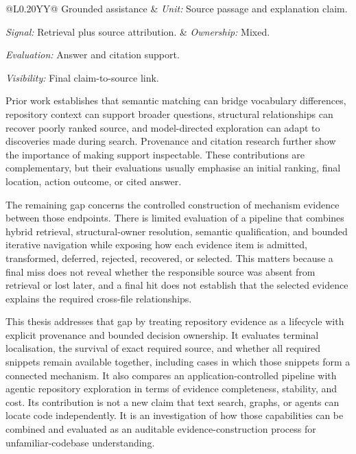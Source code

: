 \begin{table}[htbp]
\begin{tabularx}{\linewidth}{
  @{}L{0.20\linewidth}YY@{}
}
Grounded assistance
& \textit{Unit:} Source passage and explanation claim.
  \par\textit{Signal:} Retrieval plus source attribution.
& \textit{Ownership:} Mixed.
  \par\textit{Evaluation:} Answer and citation support.
  \par\textit{Visibility:} Final claim-to-source link. \\

\bottomrule
\end{tabularx}

\endgroup
\end{table}

Prior work establishes that semantic matching can bridge vocabulary differences, repository context can support broader questions, structural relationships can recover poorly ranked source, and model-directed exploration can adapt to discoveries made during search. Provenance and citation research further show the importance of making support inspectable. These contributions are complementary, but their evaluations usually emphasise an initial ranking, final location, action outcome, or cited answer.

The remaining gap concerns the controlled construction of mechanism evidence between those endpoints. There is limited evaluation of a pipeline that combines hybrid retrieval, structural-owner resolution, semantic qualification, and bounded iterative navigation while exposing how each evidence item is admitted, transformed, deferred, rejected, recovered, or selected. This matters because a final miss does not reveal whether the responsible source was absent from retrieval or lost later, and a final hit does not establish that the selected evidence explains the required cross-file relationships.

\begin{samepage}
This thesis addresses that gap by treating repository evidence as a lifecycle with explicit provenance and bounded decision ownership. It evaluates terminal localisation, the survival of exact required source, and whether all required snippets remain available together, including cases in which those snippets form a connected mechanism. It also compares an application-controlled pipeline with agentic repository exploration in terms of evidence completeness, stability, and cost. Its contribution is not a new claim that text search, graphs, or agents can locate code independently. It is an investigation of how those capabilities can be combined and evaluated as an auditable evidence-construction process for unfamiliar-codebase understanding.
\end{samepage}
